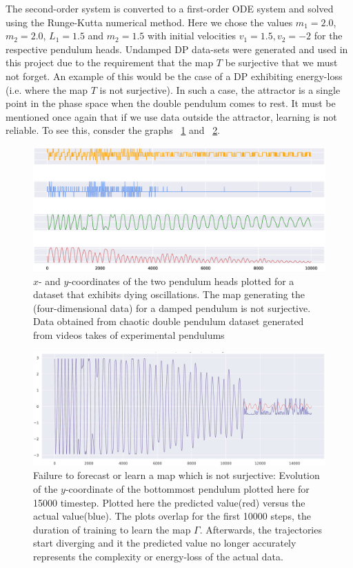 The second-order system is converted to a first-order ODE system and solved using the Runge-Kutta numerical method.  
Here we chose the values $m_1=2.0$, $m_2=2.0$, $L_1=1.5$ and $m_2=1.5$ with initial velocities $v_1=1.5, v_2=-2$ for the respective pendulum heads.
Undamped DP data-sets were generated and used in this project due to the requirement that the map $T$ be surjective that we must not forget. 
An example of this would be the case of a DP exhibiting energy-loss (i.e. where the map $T$ is not surjective). In such a case, the attractor is a single point in the phase space when the double pendulum comes to rest. 
It must be mentioned once again that if we use data outside the attractor, learning is not reliable. To see this, consder the graphs ~\ref{fig:damped_pendulum} and ~\ref{fig:dp_notsurjective}.

\begin{figure}[ht]
  \includegraphics[scale=0.4]{Graphs/_dp_dying.eps}
  \centering
\caption{$x$- and $y$-coordinates of the two pendulum heads plotted for a dataset that exhibits dying oscillations. The map generating the (four-dimensional data) for a damped pendulum is not surjective. Data obtained from chaotic double pendulum dataset generated from videos takes of experimental pendulums~\cite{asseman2018learning}}
\label{fig:damped_pendulum}
\end{figure}



\begin{figure}[ht]
  \includegraphics[scale=0.3]{Graphs/_dpfail_nonsurj.eps}
  \centering
\caption{Failure to forecast or learn a map which is not surjective: Evolution of the $y$-coordinate of the bottommost pendulum plotted here for 15000 timestep. Plotted here the predicted value(red) versus the actual value(blue). The plots overlap for the first 10000 steps, the duration of training to learn the map $\Gamma$. Afterwards, the trajectories start diverging and it the predicted value no longer accurately represents the complexity or energy-loss of the actual data. }
\label{fig:dp_notsurjective}
\end{figure}




